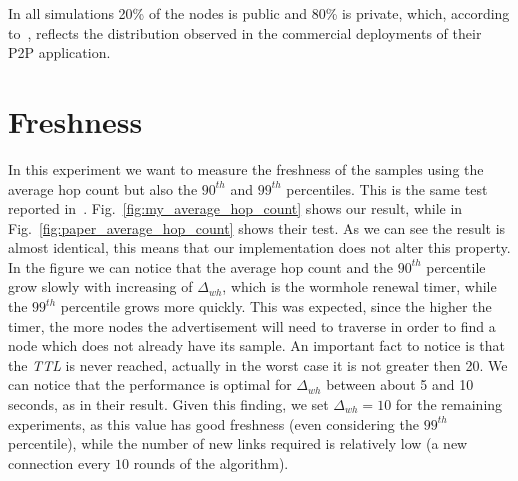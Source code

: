 In all simulations 20\% of the nodes is public and 80\% is private, which, according to~\cite{wormhole}, reflects the distribution observed in the commercial deployments of their P2P application.

\section{Freshness}
\label{sec:eval_freshness}
In this experiment we want to measure the freshness of the samples using the average hop count but also the \textit{$90^{th}$} and \textit{$99^{th}$} percentiles. This is the same test reported in~\cite{wormhole}. Fig.~\ref{fig:my_average_hop_count} shows our result, while in Fig.~\ref{fig:paper_average_hop_count} shows their test. As we can see the result is almost identical, this means that our implementation does not alter this property. In the figure we can notice that the average hop count and the $90^{th}$ percentile grow slowly with increasing of $\Delta_{wh}$, which is the wormhole renewal timer, while the $99^{th}$ percentile grows more quickly. This was expected, since the higher the timer, the more nodes the advertisement will need to traverse in order to find a node which does not already have its sample. An important fact to notice is that the \textit{TTL} is never reached, actually in the worst case it is not greater then 20. We can notice that the performance is optimal for $\Delta_{wh}$  between about 5 and 10 seconds, as in their result. Given this finding, we set $\Delta_{wh} = 10$ for the remaining experiments, as this value has good freshness (even considering the $99^{th}$ percentile), while the number of new links required is relatively low (a new connection every $10$ rounds of the algorithm). 

